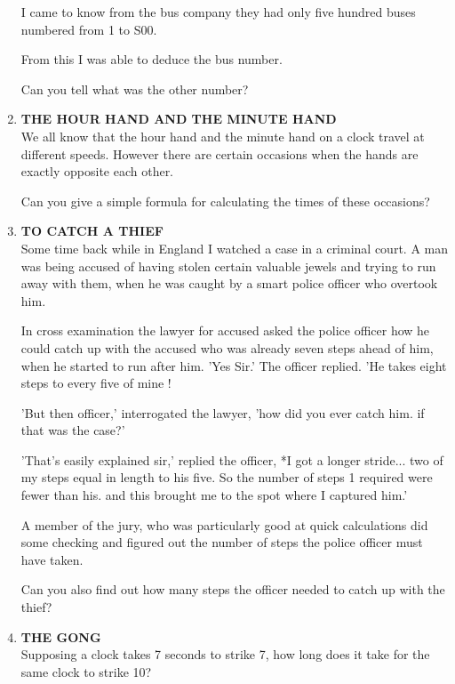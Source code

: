 \documentclass[12pt]{article}
\begin{document}
\begin{enumerate}
I came  to know  from  the bus  company  they  had only five hundred  buses  numbered  from  1 to S00. 

From  this  I was  able  to deduce  the bus number. 

Can you tell what  was the other  number? 
%
\item \textbf{THE  HOUR  HAND  AND  THE  MINUTE  HAND} \\
We all know  that  the  hour  hand  and  the  minute  hand on a clock  travel  at different  speeds.  However  there  are certain  occasions  when  the hands  are exactly  opposite  each other.  

Can  you  give  a simple  formula  for calculating the times  of these  occasions? 

%
\item \textbf{TO  CATCH  A THIEF} \\
Some  time  back  while  in England  I watched  a case in a criminal  court.  A man  was  being  accused  of having stolen  certain  valuable  jewels  and  trying  to run  away with them,  when  he was caught  by a smart  police  officer who overtook  him. 

In cross  examination  the lawyer  for accused  asked  the police  officer  how  he could  catch  up with  the accused  who was already  seven  steps  ahead  of him,  when  he started  to run after  him.  'Yes  Sir.'  The  officer  replied.  'He  takes eight  steps  to every  five of mine  ! 

'But then  officer,'  interrogated  the  lawyer,  'how  did you ever  catch  him.  if that was  the case?' 

'That's  easily  explained  sir,'  replied  the officer,  *I got a longer  stride...  two  of my steps  equal  in length  to his five. So  the number  of steps  1 required  were  fewer  than his. and this  brought  me  to the  spot  where  I captured him.' 

A member  of the  jury,  who  was particularly  good  at quick  calculations  did  some  checking  and  figured  out the number  of steps  the police  officer  must  have  taken. 

Can you also  find  out  how  many  steps  the  officer needed  to catch  up with  the thief? 

%
\item \textbf{THE  GONG} \\
Supposing  a clock  takes  7 seconds  to strike  7, how long does  it take  for the same  clock  to strike  10? 


\end{enumerate}
\end{document}
